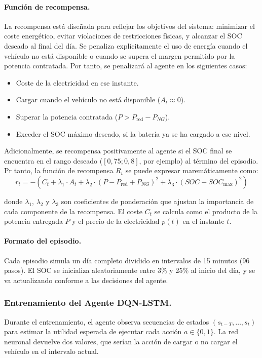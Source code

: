 \paragraph{Función de recompensa.} 
La recompensa está diseñada para reflejar los objetivos del sistema: minimizar el coste energético, 
evitar violaciones de restricciones físicas, y alcanzar el SOC deseado al final del día. Se 
penaliza explícitamente el uso de energía cuando el vehículo no está disponible o cuando se supera 
el margen permitido por la potencia contratada. Por tanto, se penalizará al agente en los siguientes
casos:
\begin{itemize}
    \item Coste de la electricidad en ese instante.
    \item Cargar cuando el vehículo no está disponible (\(A_t \approx 0\)).
    \item Superar la potencia contratada (\(P > P_{\text{red}} - P_{NG}\)).
    \item Exceder el SOC máximo deseado, si la batería ya se ha cargado a ese nivel.
\end{itemize}

Adicionalmente, se recompensa positivamente al agente si el SOC final se encuentra en el rango 
deseado (\([0{,}75;0{,}8]\), por ejemplo) al término del episodio. Pr tanto, la función de 
recompensa \(R_t\) se puede expresar maremáticamente como:
\begin{equation}
    r_t = -\left( C_t + \lambda_1 \cdot A_t + \lambda_2 \cdot (P - P_{\text{red}} + P_{NG})^2 +
    \lambda_3 \cdot (SOC - SOC_{\text{max}})^2 \right)
\end{equation}

donde \(\lambda_1\), \(\lambda_2\) y \(\lambda_3\) son coeficientes de ponderación que ajustan la
importancia de cada componente de la recompensa. El coste \(C_t\) se calcula como el producto 
de la potencia entregada \(P\) y el precio de la electricidad \(p(t)\) en el instante \(t\).

\paragraph{Formato del episodio.}  
Cada episodio simula un día completo dividido en intervalos de 15 minutos (96 pasos). El SOC se 
inicializa aleatoriamente entre 3\% y 25\% al inicio del día, y se va actualizando conforme a las 
decisiones del agente.

\subsubsection{Entrenamiento del Agente DQN-LSTM.}  
Durante el entrenamiento, el agente observa secuencias de estados \((s_{t-T}, \ldots, s_t)\) para 
estimar la utilidad esperada de ejecutar cada acción \(a \in \{0, 1\}\). La red neuronal devuelve 
dos valores, que serían la acción de cargar o no cargar el vehículo en el intervalo actual.

